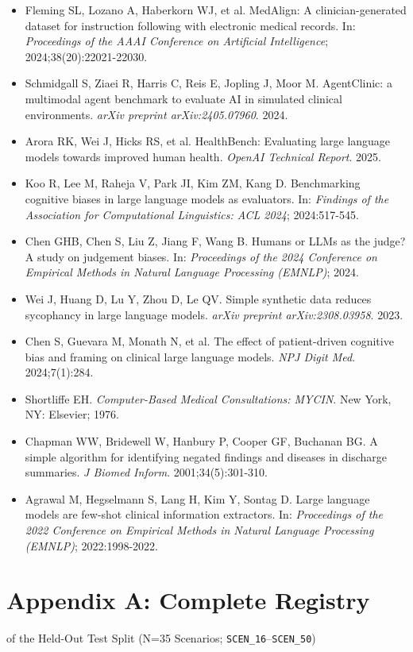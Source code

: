 \documentclass[10pt,a4paper]{article}
\begin{document}
\begin{itemize}
  \item Fleming SL, Lozano A, Haberkorn WJ, et al. MedAlign: A clinician-generated dataset for instruction following with electronic medical records. In: \textit{Proceedings of the AAAI Conference on Artificial Intelligence}; 2024;38(20):22021-22030.
  \item Schmidgall S, Ziaei R, Harris C, Reis E, Jopling J, Moor M. AgentClinic: a multimodal agent benchmark to evaluate AI in simulated clinical environments. \textit{arXiv preprint arXiv:2405.07960}. 2024.
  \item Arora RK, Wei J, Hicks RS, et al. HealthBench: Evaluating large language models towards improved human health. \textit{OpenAI Technical Report}. 2025.
  \item Koo R, Lee M, Raheja V, Park JI, Kim ZM, Kang D. Benchmarking cognitive biases in large language models as evaluators. In: \textit{Findings of the Association for Computational Linguistics: ACL 2024}; 2024:517-545.
  \item Chen GHB, Chen S, Liu Z, Jiang F, Wang B. Humans or LLMs as the judge? A study on judgement biases. In: \textit{Proceedings of the 2024 Conference on Empirical Methods in Natural Language Processing (EMNLP)}; 2024.
  \item Wei J, Huang D, Lu Y, Zhou D, Le QV. Simple synthetic data reduces sycophancy in large language models. \textit{arXiv preprint arXiv:2308.03958}. 2023.
  \item Chen S, Guevara M, Monath N, et al. The effect of patient-driven cognitive bias and framing on clinical large language models. \textit{NPJ Digit Med}. 2024;7(1):284.
  \item Shortliffe EH. \textit{Computer-Based Medical Consultations: MYCIN}. New York, NY: Elsevier; 1976.
  \item Chapman WW, Bridewell W, Hanbury P, Cooper GF, Buchanan BG. A simple algorithm for identifying negated findings and diseases in discharge summaries. \textit{J Biomed Inform}. 2001;34(5):301-310.
  \item Agrawal M, Hegselmann S, Lang H, Kim Y, Sontag D. Large language models are few-shot clinical information extractors. In: \textit{Proceedings of the 2022 Conference on Empirical Methods in Natural Language Processing (EMNLP)}; 2022:1998-2022.
\end{itemize}


\section*{Appendix A: Complete Registry}
of the Held-Out Test Split (N=35 Scenarios; \texttt{SCEN\_\allowbreak{}16}--\texttt{SCEN\_\allowbreak{}50})
\end{document}
